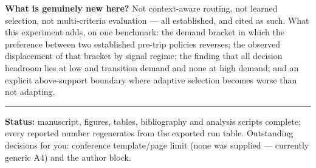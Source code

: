 \documentclass[10pt,a4paper]{article}
\begin{document}
\textbf{What is genuinely new here?} Not context-aware routing, not learned selection, not multi-criteria evaluation --- all established, and cited as such. What this experiment adds, on one benchmark: the demand bracket in which the preference between two established pre-trip policies reverses; the observed displacement of that bracket by signal regime; the finding that all decision headroom lies at low and transition demand and none at high demand; and an explicit above-support boundary where adaptive selection becomes worse than not adapting.

\vspace{3pt}\hrule\vspace{4pt}
{\small\textbf{Status:} manuscript, figures, tables, bibliography and analysis scripts complete; every reported number regenerates from the exported run table. Outstanding decisions for you: conference template/page limit (none was supplied --- currently generic A4) and the author block.}
\end{document}
